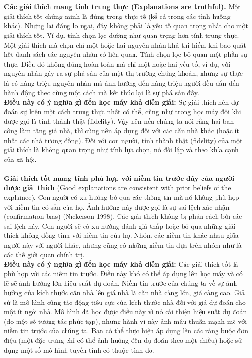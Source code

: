 \\\\\textbf{Các giải thích mang tính trung thực (Explanations are truthful).} Một giải thích tốt chứng minh là đúng trong thực tế (kể cả trong các tình huống khác). Nhưng lại đáng lo ngại, đây không phải là yếu tố quan trọng nhất cho một giải thích tốt. Ví dụ, tính chọn lọc dường như quan trọng hơn tính trung thực. Một giải thích mà chọn chỉ một hoặc hai nguyên nhân khả thi hiếm khi bao quát hết danh sách các nguyên nhân có liên quan. Tính chọn lọc bỏ quan một phần sự thực. Điều đó không đúng hoàn toàn mà chỉ một hoặc hai yếu tố, ví dụ, với nguyên nhân gây ra sự phá sản của một thị trường chứng khoán, nhưng sự thực là có hàng triệu nguyên nhân mà ảnh hưởng đến hàng triệu người đều dẩn đến hành động theo cùng một cách mà kết thúc lại là sự phá sản đấy.
\\\textbf{Điều này có ý nghĩa gì đến học máy khả diễn giải:} Sự giải thích nên dự đoán sự kiện một cách trung thực nhất có thể, cũng như trong học máy đôi khi được gọi là tính thành thật (fidelity). Vậy nên nếu chúng ta nói rằng hai ban công làm tăng giá nhà, thì cũng nên áp dụng đối với các căn nhà khác (hoặc ít nhất các nhà tương đồng). Đối với con người, tính thành thật (fidelity) của một giải thích là không quan trọng như tính lựa chọn, nó đối lập và theo khía cạnh của xã hội. 
\\\\\textbf{Giải thích tốt mang tính phù hợp với niềm tin trước đây của người được giải thích} (Good explanations are consistent with prior beliefs of the explainee). Con người có xu hướng bỏ qua các thông tin mà nó không phù hợp với niềm tin có sẵn của họ. Ảnh hưởng này được gọi là sự sai lệch xác nhận (confirmation bias) (Nickerson 1998). Các giải thích không bị phân cách bởi các sai lệch này. Con người sẽ có xu hướng đánh giá thấp hoặc bỏ qua những giải thích không đồng tình với niềm tin của họ. Nhóm các niềm tin khác nhau giữa người này với người khác, nhưng cũng có những niềm tin dựa trên nhóm như là các thế giới quan chính trị.
\\\textbf{Điều này có ý nghĩa gì đến học máy khả diễn giải:} Các giải thích tốt là phù hợp với các niềm tin trước. Điều này khó có thể áp dụng lên học máy và có lẽ sẽ ảnh hưởng lớn hiệu suất dự đoán. Niềm tin trước của chúng ta về sự ảnh hưởng của kích thước căn nhà lên giá nhà là căn nhà càng lớn, giá càng cao. Giả sử là mô hình cũng tác động tiêu cực của kích thước nhà đối với giá dự đoán cho một ít ngôi nhà. Mô hình đã học được điều này vì nó cải thiện hiệu suất dự đoán (do một số tương tác phức tạp), nhưng hành vi này ảnh mâu thuẫn mạnh mẽ với niềm tin trước của chúng ta. Bạn có thể thực hiện áp dụng lên các ràng buộc đơn điệu (một đặc trưng chỉ có thể ảnh hướng đến dự đoán theo một chiều) hoặc sử dụng một số mô hình tuyến tính có thuộc tính đó.
